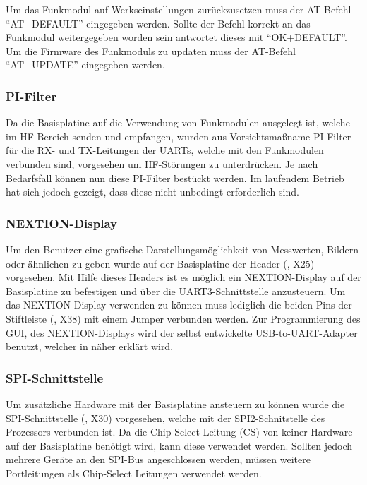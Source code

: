 Um das Funkmodul auf Werkseinstellungen zurückzusetzen muss der AT-Befehl \enquote{AT+DEFAULT} eingegeben werden. Sollte der Befehl korrekt an das Funkmodul weitergegeben worden sein antwortet dieses mit \enquote{OK+DEFAULT}. Um die Firmware des Funkmoduls zu updaten muss der AT-Befehl \enquote{AT+UPDATE} eingegeben werden.

\subsubsection{PI-Filter}
Da die \gls{Basisplatine} auf die Verwendung von Funkmodulen ausgelegt ist, welche im HF-Bereich senden und empfangen, wurden aus Vorsichtsmaßname PI-Filter für die RX- und TX-Leitungen der UARTs, welche mit den Funkmodulen verbunden sind, vorgesehen um HF-Störungen zu unterdrücken. Je nach Bedarfsfall können nun diese PI-Filter bestückt werden. Im laufendem Betrieb hat sich jedoch gezeigt, dass diese nicht unbedingt erforderlich sind.


\subsubsection{NEXTION-Display}
Um den Benutzer eine grafische Darstellungsmöglichkeit von Messwerten, Bildern oder ähnlichen zu geben wurde auf der Basisplatine der Header (, X25) vorgesehen. Mit Hilfe dieses Headers ist es möglich ein NEXTION-Display auf der Basisplatine zu befestigen und über die UART3-Schnittstelle anzusteuern. Um das NEXTION-Display verwenden zu können muss lediglich die beiden Pins der Stiftleiste (, X38) mit einem Jumper verbunden werden. Zur Programmierung des \gls{GUI}, des NEXTION-Displays wird der selbst entwickelte \gls{USB-to-UART}-Adapter benutzt, welcher in  näher erklärt wird.


\subsubsection{SPI-Schnittstelle}
Um zusätzliche Hardware mit der \gls{Basisplatine} ansteuern zu können wurde die SPI-Schnittstelle (, X30) vorgesehen, welche mit der SPI2-Schnitstelle des Prozessors verbunden ist. Da die Chip-Select Leitung (CS) von keiner Hardware auf der Basisplatine benötigt wird, kann diese verwendet werden. Sollten jedoch mehrere Geräte an den SPI-Bus angeschlossen werden, müssen weitere Portleitungen als Chip-Select Leitungen verwendet werden.

